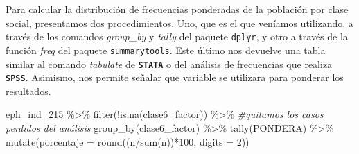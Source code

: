 \documentclass[
]{book}
\newenvironment{Shaded}{\begin{snugshade}}{\end{snugshade}}
\newcommand{\AttributeTok}[1]{\textcolor[rgb]{0.77,0.63,0.00}{#1}}
\newcommand{\CommentTok}[1]{\textcolor[rgb]{0.56,0.35,0.01}{\textit{#1}}}
\newcommand{\DecValTok}[1]{\textcolor[rgb]{0.00,0.00,0.81}{#1}}
\newcommand{\FunctionTok}[1]{\textcolor[rgb]{0.00,0.00,0.00}{#1}}
\newcommand{\NormalTok}[1]{#1}
\newcommand{\OtherTok}[1]{\textcolor[rgb]{0.56,0.35,0.01}{#1}}
\newcommand{\SpecialCharTok}[1]{\textcolor[rgb]{0.00,0.00,0.00}{#1}}
\newcommand{\StringTok}[1]{\textcolor[rgb]{0.31,0.60,0.02}{#1}}
\begin{document}
\begin{Shaded}
\end{Shaded}

Para calcular la distribución de frecuencias ponderadas de la población por clase social, presentamos dos procedimientos. Uno, que es el que veníamos utilizando, a través de los comandos \emph{group\_by} y \emph{tally} del paquete \texttt{dplyr}, y otro a través de la función \emph{freq} del paquete \texttt{summarytools}. Este último nos devuelve una tabla similar al comando \emph{tabulate} de \textbf{\texttt{STATA}} o del análisis de frecuencias que realiza \textbf{\texttt{SPSS}}. Asimismo, nos permite señalar que variable se utilizara para ponderar los resultados.

\begin{Shaded}
\begin{Highlighting}[]
\NormalTok{eph\_ind\_215 }\SpecialCharTok{\%\textgreater{}\%}
    \FunctionTok{filter}\NormalTok{(}\SpecialCharTok{!}\FunctionTok{is.na}\NormalTok{(clase6\_factor)) }\SpecialCharTok{\%\textgreater{}\%} \CommentTok{\#quitamos los casos perdidos del análisis }
    \FunctionTok{group\_by}\NormalTok{(clase6\_factor) }\SpecialCharTok{\%\textgreater{}\%} 
    \FunctionTok{tally}\NormalTok{(PONDERA) }\SpecialCharTok{\%\textgreater{}\%} 
    \FunctionTok{mutate}\NormalTok{(}\AttributeTok{porcentaje =} \FunctionTok{round}\NormalTok{((n}\SpecialCharTok{/}\FunctionTok{sum}\NormalTok{(n))}\SpecialCharTok{*}\DecValTok{100}\NormalTok{, }\AttributeTok{digits =} \DecValTok{2}\NormalTok{))}
\end{Highlighting}
\end{Shaded}
\end{document}
